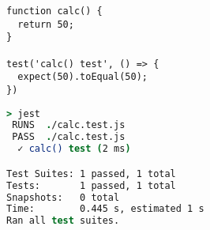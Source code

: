 \begin{lstlisting}[style=ES6, label=lst:jest-example, caption={Jest Unit Testing Example}]
function calc() {
  return 50;
}

test('calc() test', () => {
  expect(50).toEqual(50);
})
\end{lstlisting}

\begin{lstlisting}[language=csh, label=lst:jest-output, caption={Jest Unit
Testing Example Output}]
> jest
 RUNS  ./calc.test.js
 PASS  ./calc.test.js
  ✓ calc() test (2 ms)

Test Suites: 1 passed, 1 total
Tests:       1 passed, 1 total
Snapshots:   0 total
Time:        0.445 s, estimated 1 s
Ran all test suites.
\end{lstlisting}
